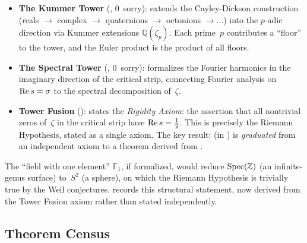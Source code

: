 \begin{itemize}
  \item \textbf{The Kummer Tower} (, 0~sorry):
    extends the Cayley-Dickson construction (reals $\to$ complex $\to$
    quaternions $\to$ octonions $\to \ldots$) into the $p$-adic direction
    via Kummer extensions $\mathbb{Q}(\zeta_p)$. Each prime~$p$ contributes a
    ``floor'' to the tower, and the Euler product is the product of
    all floors.

  \item \textbf{The Spectral Tower} (, 0~sorry):
    formalizes the Fourier harmonics in the imaginary direction of the
    critical strip, connecting Fourier analysis on $\operatorname{Re} s = \sigma$
    to the spectral decomposition of~$\zeta$.

  \item \textbf{Tower Fusion} ():
    states the \emph{Rigidity Axiom}: the assertion that
    all nontrivial zeros of~$\zeta$ in the critical strip have
    $\operatorname{Re} s = \tfrac{1}{2}$.  This is precisely the Riemann Hypothesis,
    stated as a single axiom.  The key result:
     (in ) is \emph{graduated}
    from an independent axiom to a theorem derived from .
\end{itemize}

\begin{remark}
The ``field with one element'' $\mathbb{F}_1$, if formalized, would reduce
$\operatorname{Spec}(\mathbb{Z})$ (an infinite-genus surface) to~$S^2$ (a sphere), on which
the Riemann Hypothesis is trivially true by the Weil conjectures.
 records this structural statement, now derived from
the Tower Fusion axiom rather than stated independently.
\end{remark}

\subsection{Theorem Census}

